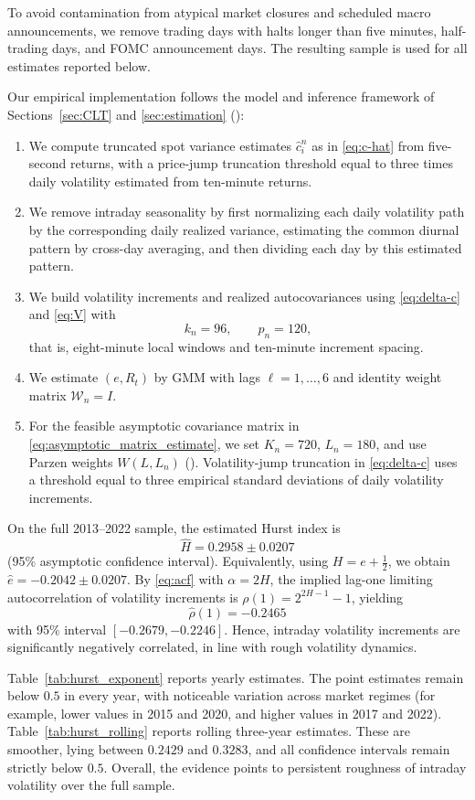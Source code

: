 \documentclass[ecta,nameyear,draft]{econsocart}
\def\wh{\widehat}
\newcommand{\1}{\mathbf 1}
\newcommand{\calW}{\mathcal{W}}
\numberwithin{equation}{section}
\begin{document}
To avoid contamination from atypical market closures and scheduled macro announcements, we remove trading days with halts longer than five minutes, half-trading days, and FOMC announcement days. The resulting sample is used for all estimates reported below.

Our empirical implementation follows the model and inference framework of Sections~\ref{sec:CLT} and \ref{sec:estimation} (\cite{ait2014high,JP,chong2022CLT}):
\begin{enumerate}
\item We compute truncated spot variance estimates $\wh c_i^n$ as in \eqref{eq:c-hat} from five-second returns, with a price-jump truncation threshold equal to three times daily volatility estimated from ten-minute returns.
\item We remove intraday seasonality by first normalizing each daily volatility path by the corresponding daily realized variance, estimating the common diurnal pattern by cross-day averaging, and then dividing each day by this estimated pattern.
\item We build volatility increments and realized autocovariances using \eqref{eq:delta-c} and \eqref{eq:V} with
\[
k_n=96,\qquad p_n=120,
\]
that is, eight-minute local windows and ten-minute increment spacing.
\item We estimate $(e,R_t)$ by GMM with lags $\ell=1,\dots,6$ and identity weight matrix $\calW_n=I$.
\item For the feasible asymptotic covariance matrix in \eqref{eq:asymptotic_matrix_estimate}, we set $K_n=720$, $L_n=180$, and use Parzen weights $W(L,L_n)$ (\cite{li2016generalized}). Volatility-jump truncation in \eqref{eq:delta-c} uses a threshold equal to three empirical standard deviations of daily volatility increments.
\end{enumerate}

On the full 2013--2022 sample, the estimated Hurst index is
\[
\wh H = 0.2958 \pm 0.0207
\]
(95\% asymptotic confidence interval). Equivalently, using $H=e+\frac12$, we obtain $\wh e=-0.2042 \pm 0.0207$. By \eqref{eq:acf} with $\alpha=2H$, the implied lag-one limiting autocorrelation of volatility increments is $\rho(1)=2^{2H-1}-1$, yielding
\[
\wh\rho(1)=-0.2465
\]
with 95\% interval $[-0.2679,-0.2246]$. Hence, intraday volatility increments are significantly negatively correlated, in line with rough volatility dynamics.

Table~\ref{tab:hurst_exponent} reports yearly estimates. The point estimates remain below $0.5$ in every year, with noticeable variation across market regimes (for example, lower values in 2015 and 2020, and higher values in 2017 and 2022). Table~\ref{tab:hurst_rolling} reports rolling three-year estimates. These are smoother, lying between $0.2429$ and $0.3283$, and all confidence intervals remain strictly below $0.5$. Overall, the evidence points to persistent roughness of intraday volatility over the full sample.
\end{document}
